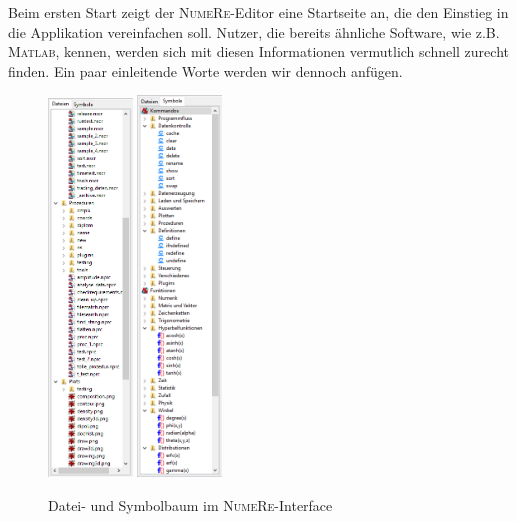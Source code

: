 \documentclass[DIV=14,headsepline,footsepline]{scrbook}
\newcommand{\NR}{\textsc{Nu\-me\-Re}}
\begin{document}
				Beim ersten Start zeigt der \NR-Editor eine Startseite an, die den Einstieg in die Applikation vereinfachen soll. Nutzer, die bereits ähnliche Software, wie z.B. \textsc{Matlab}, kennen, werden sich mit diesen Informationen vermutlich schnell zurecht finden. Ein paar einleitende Worte werden wir dennoch anfügen.
				\begin{figure}[p]%
					\centering
					\includegraphics[width=0.2\textwidth]{_graphics/filetree.png}\hspace{5em}
					\includegraphics[width=0.2\textwidth]{_graphics/symboltree.png}
					\caption{Datei- und Symbolbaum im \NR-Interface}
					\label{fig:trees}
				\end{figure}
				
\end{document}
